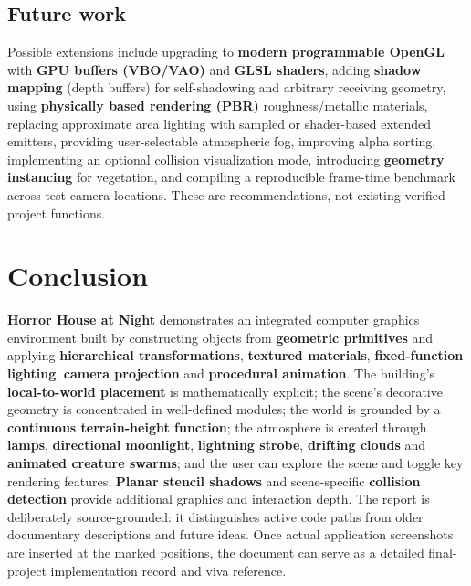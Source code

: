 \documentclass[10pt,a4paper,oneside]{article}
\begin{document}
\subsection{Future work}
Possible extensions include upgrading to \textbf{modern programmable OpenGL} with \textbf{GPU buffers (VBO/VAO)} and \textbf{GLSL shaders}, adding \textbf{shadow mapping} (depth buffers) for self-shadowing and arbitrary receiving geometry, using \textbf{physically based rendering (PBR)} roughness/metallic materials, replacing approximate area lighting with sampled or shader-based extended emitters, providing user-selectable atmospheric fog, improving alpha sorting, implementing an optional collision visualization mode, introducing \textbf{geometry instancing} for vegetation, and compiling a reproducible frame-time benchmark across test camera locations. These are recommendations, not existing verified project functions.

\section{Conclusion}
\textbf{Horror House at Night} demonstrates an integrated computer graphics environment built by constructing objects from \textbf{geometric primitives} and applying \textbf{hierarchical transformations}, \textbf{textured materials}, \textbf{fixed-function lighting}, \textbf{camera projection} and \textbf{procedural animation}. The building's \textbf{local-to-world placement} is mathematically explicit; the scene's decorative geometry is concentrated in well-defined modules; the world is grounded by a \textbf{continuous terrain-height function}; the atmosphere is created through \textbf{lamps}, \textbf{directional moonlight}, \textbf{lightning strobe}, \textbf{drifting clouds} and \textbf{animated creature swarms}; and the user can explore the scene and toggle key rendering features. \textbf{Planar stencil shadows} and scene-specific \textbf{collision detection} provide additional graphics and interaction depth. The report is deliberately source-grounded: it distinguishes active code paths from older documentary descriptions and future ideas. Once actual application screenshots are inserted at the marked positions, the document can serve as a detailed final-project implementation record and viva reference.
\end{document}
